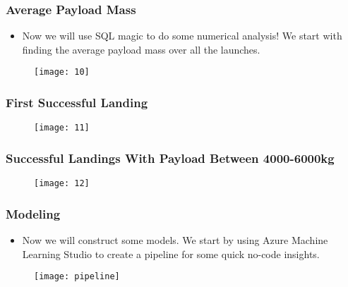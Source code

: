 \documentclass{beamer}
\begin{document}
\begin{frame}

\frametitle{Average Payload Mass}

\begin{itemize}

\item Now we will use SQL magic to do some numerical analysis! We start with finding the average payload mass over all the launches.

\end{itemize}


\begin{figure}
\texttt{[image: 10]}
\end{figure}

\end{frame}


\begin{frame}

\frametitle{First Successful Landing}


\begin{figure}
\texttt{[image: 11]}
\end{figure}

\end{frame}


\begin{frame}

\frametitle{Successful Landings With Payload Between 4000-6000kg}


\begin{figure}
\texttt{[image: 12]}
\end{figure}

\end{frame}


\begin{frame}

\frametitle{Modeling}

\begin{itemize}

\item Now we will construct some models. We start by using Azure Machine Learning Studio to create a pipeline for some quick no-code insights.

\end{itemize}

\begin{figure}
\texttt{[image: pipeline]}
\end{figure}



\end{frame}
\end{document}
